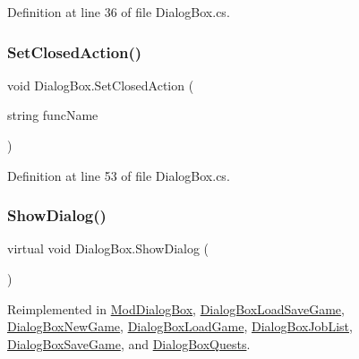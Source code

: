 Definition at line 36 of file Dialog\+Box.\+cs.

\mbox{\label{class_dialog_box_a730b66f1a8be9d26e4edc01d3f6bbbe0}} 
\subsubsection{\texorpdfstring{Set\+Closed\+Action()}{SetClosedAction()}}
{\footnotesize\ttfamily void Dialog\+Box.\+Set\+Closed\+Action (\begin{DoxyParamCaption}\item[{string}]{func\+Name }\end{DoxyParamCaption})}



Definition at line 53 of file Dialog\+Box.\+cs.

\mbox{\label{class_dialog_box_a971a6e45f6ca26863c3910680521b0ac}} 
\subsubsection{\texorpdfstring{Show\+Dialog()}{ShowDialog()}}
{\footnotesize\ttfamily virtual void Dialog\+Box.\+Show\+Dialog (\begin{DoxyParamCaption}{ }\end{DoxyParamCaption})\hspace{0.3cm}{\ttfamily [virtual]}}



Reimplemented in \hyperlink{class_mod_dialog_box_aaeae20aeb93688e1acc1cce9e9965c48}{Mod\+Dialog\+Box}, \hyperlink{class_dialog_box_load_save_game_ae44957b0dcc55696639d534c04574c57}{Dialog\+Box\+Load\+Save\+Game}, \hyperlink{class_dialog_box_new_game_a80ad43c7b72fad35a600511e95578eea}{Dialog\+Box\+New\+Game}, \hyperlink{class_dialog_box_load_game_af9b80f18655ef0ae924e49142fd12bf0}{Dialog\+Box\+Load\+Game}, \hyperlink{class_dialog_box_job_list_a09f09a252b810e63c0f2ee221bef2685}{Dialog\+Box\+Job\+List}, \hyperlink{class_dialog_box_save_game_a83ed557d75cb749de3b8e3a6b60e1c3d}{Dialog\+Box\+Save\+Game}, and \hyperlink{class_dialog_box_quests_a968edfaf61e0958ded355ecec802c2b9}{Dialog\+Box\+Quests}.



